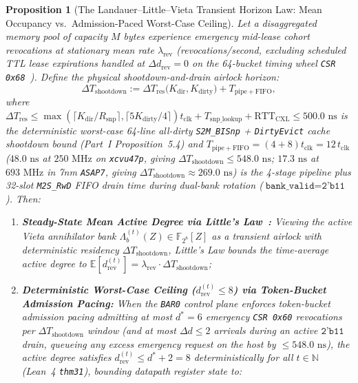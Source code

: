 \documentclass[10pt,twocolumn]{article}
\theoremstyle{spectralthm}
\newtheorem{proposition}[theorem]{Proposition}
\begin{document}
\begin{proposition}[The Landauer--Little--Vieta Transient Horizon Law: Mean Occupancy vs.\ Admission-Paced Worst-Case Ceiling]
\label{prop:little_vieta}
Let a disaggregated memory pool of capacity $M$ bytes experience emergency mid-lease cohort revocations at stationary mean rate $\lambda_{\mathrm{rev}}$ (revocations/second, excluding scheduled TTL lease expirations handled at $\Delta d_{\mathrm{rev}} = 0$ on the 64-bucket timing wheel \texttt{CSR 0x68}~\cite{varghese1997timing}). Define the physical shootdown-and-drain airlock horizon:
\begin{equation}
\label{eq:shootdown_horizon}
\Delta T_{\mathrm{shootdown}} := \Delta T_{\mathrm{res}}\bigl(K_{\mathrm{dir}}, K_{\mathrm{dirty}}\bigr) + T_{\mathrm{pipe+FIFO}},
\end{equation}
where $\Delta T_{\mathrm{res}} \le \max(\lceil K_{\mathrm{dir}}/R_{\mathrm{snp}}\rceil, \lceil 5K_{\mathrm{dirty}}/4\rceil)t_{\mathrm{clk}} + T_{\mathrm{snp\_lookup}} + \mathrm{RTT}_{\mathrm{CXL}} \le 500.0\text{~ns}$ is the deterministic worst-case 64-line all-dirty \texttt{S2M\_BISnp} + \texttt{DirtyEvict} cache shootdown bound (Part~I Proposition~5.4) and $T_{\mathrm{pipe+FIFO}} = (4 + 8)t_{\mathrm{clk}} = 12\,t_{\mathrm{clk}}$ ($48.0\text{~ns}$ at $250\text{~MHz}$ on \texttt{xcvu47p}, giving $\Delta T_{\mathrm{shootdown}} \le 548.0\text{~ns}$; $17.3\text{~ns}$ at $693\text{~MHz}$ in 7nm \texttt{ASAP7}, giving $\Delta T_{\mathrm{shootdown}} \approx 269.0\text{~ns}$) is the 4-stage pipeline plus 32-slot \texttt{M2S\_RwD} FIFO drain time during dual-bank rotation ($\texttt{bank\_valid} = \texttt{2'b11}$). Then:
\begin{enumerate}
  \item[(i)] \textbf{Steady-State Mean Active Degree via Little's Law~\cite{little1961proof}:} Viewing the active Vieta annihilator bank $\Lambda_b^{(t)}(Z) \in \mathbb{F}_{2^8}[Z]$ as a transient airlock with deterministic residency $\Delta T_{\mathrm{shootdown}}$, Little's Law bounds the time-average active degree to $\mathbb{E}[d_{\mathrm{rev}}^{(t)}] = \lambda_{\mathrm{rev}} \cdot \Delta T_{\mathrm{shootdown}}$;
  \item[(ii)] \textbf{Deterministic Worst-Case Ceiling ($d_{\mathrm{rev}}^{(t)} \le 8$) via Token-Bucket Admission Pacing:} When the \texttt{BAR0} control plane enforces token-bucket admission pacing admitting at most $d^* = 6$ emergency \texttt{CSR 0x60} revocations per $\Delta T_{\mathrm{shootdown}}$ window (and at most $\Delta d \le 2$ arrivals during an active $\texttt{2'b11}$ drain, queueing any excess emergency request on the host by $\le 548.0\text{~ns}$), the active degree satisfies $d_{\mathrm{rev}}^{(t)} \le d^* + 2 = 8$ deterministically for all $t \in \mathbb{N}$ (Lean~4 \texttt{thm31}), bounding datapath register state to:

\end{enumerate}
\end{proposition}
\end{document}
